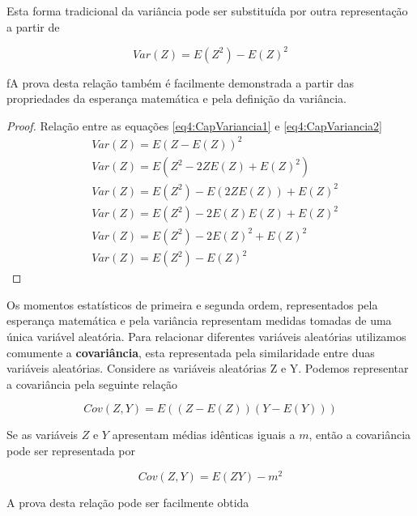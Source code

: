 Esta forma tradicional da variância pode ser substituída por outra representação a partir de 

\begin{equation}\label{eq4:CapVariancia2}
Var\left(Z \right)= E(Z^2) - E(Z)^2
\end{equation} 

fA prova desta relação também é facilmente demonstrada a partir das propriedades da esperança matemática e pela definição da variância.

\begin{proof} 
	Relação entre as equações \ref{eq4:CapVariancia1} e \ref{eq4:CapVariancia2}
	\begin{align*} 
	&Var\left( Z \right)= E\left( Z -E(Z) \right)^2  \\
	&Var\left(Z \right)= E\left( Z^2 -2ZE\left( Z\right)+ E(Z)^2 \right) \\
	&Var\left(Z \right)= E(Z^2) -E(2ZE(Z)) +E(Z)^2  \\
	&Var\left(Z \right)= E(Z^2) -2E(Z)E(Z) +E(Z)^2  \\
	&Var\left(Z \right)= E(Z^2) -2E(Z)^2 +E(Z)^2 \\
	&Var\left(Z \right)= E(Z^2) - E(Z)^2
	\end{align*}
\end{proof}

 Os momentos estatísticos de primeira e segunda ordem, representados pela esperança matemática e pela variância representam medidas tomadas de uma única variável aleatória. Para relacionar diferentes variáveis aleatórias utilizamos comumente a \textbf{covariância}, esta representada pela similaridade entre duas variáveis aleatórias. Considere as variáveis aleatórias Z e Y. Podemos representar a covariância pela seguinte relação
 
 \begin{equation}\label{eq6:CapCorrelacao}
 Cov\left(Z,Y\right)= E\left( (Z-E(Z)) (Y-E(Y)) \right)
 \end{equation}
 
 Se as variáveis $Z$ e $Y$ apresentam médias idênticas iguais a $m$, então a covariância pode ser representada por 
 
  \begin{equation}\label{eq6:CapCorrelacao}
 Cov\left(Z,Y\right)= E\left( ZY \right) - m^{2}
 \end{equation}
 
 A prova desta relação pode ser facilmente obtida 
 
